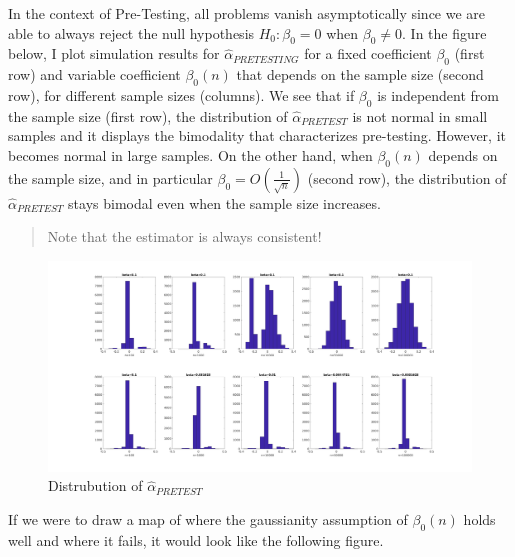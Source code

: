 \documentclass[12pt,]{book}
\begin{document}
In the context of Pre-Testing, all problems vanish asymptotically since we are able to always reject the null hypothesis \(H_0 : \beta_0 = 0\) when \(\beta_0 \neq 0\). In the figure below, I plot simulation results for \(\hat \alpha_{PRETESTING}\) for a fixed coefficient \(\beta_0\) (first row) and variable coefficient \(\beta_0(n)\) that depends on the sample size (second row), for different sample sizes (columns). We see that if \(\beta_0\) is independent from the sample size (first row), the distribution of \(\hat \alpha_{PRETEST}\) is not normal in small samples and it displays the bimodality that characterizes pre-testing. However, it becomes normal in large samples. On the other hand, when \(\beta_0(n)\) depends on the sample size, and in particular \(\beta_0 = O \left( \frac{1}{\sqrt{n}} \right)\) (second row), the distribution of \(\hat \alpha_{PRETEST}\) stays bimodal even when the sample size increases.

\begin{quote}
Note that the estimator is always consistent!
\end{quote}

\begin{figure}
\centering
\includegraphics{figures/Fig_624.png}
\caption{Distrubution of \(\hat \alpha_{PRETEST}\)}
\end{figure}

If we were to draw a map of where the gaussianity assumption of \(\beta_0(n)\) holds well and where it fails, it would look like the following figure.
\end{document}
